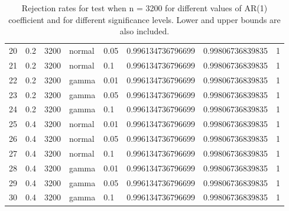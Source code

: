 \begin{table}[ht]
\begin{tabular}{rlllllll}
  20 & 0.2 & 3200 & normal & 0.05 & 0.996134736796699 & 0.99806736839835 & 1 \\ 
  21 & 0.2 & 3200 & normal & 0.1 & 0.996134736796699 & 0.99806736839835 & 1 \\ 
  22 & 0.2 & 3200 & gamma & 0.01 & 0.996134736796699 & 0.99806736839835 & 1 \\ 
  23 & 0.2 & 3200 & gamma & 0.05 & 0.996134736796699 & 0.99806736839835 & 1 \\ 
  24 & 0.2 & 3200 & gamma & 0.1 & 0.996134736796699 & 0.99806736839835 & 1 \\ 
  25 & 0.4 & 3200 & normal & 0.01 & 0.996134736796699 & 0.99806736839835 & 1 \\ 
  26 & 0.4 & 3200 & normal & 0.05 & 0.996134736796699 & 0.99806736839835 & 1 \\ 
  27 & 0.4 & 3200 & normal & 0.1 & 0.996134736796699 & 0.99806736839835 & 1 \\ 
  28 & 0.4 & 3200 & gamma & 0.01 & 0.996134736796699 & 0.99806736839835 & 1 \\ 
  29 & 0.4 & 3200 & gamma & 0.05 & 0.996134736796699 & 0.99806736839835 & 1 \\ 
  30 & 0.4 & 3200 & gamma & 0.1 & 0.996134736796699 & 0.99806736839835 & 1 \\ 
   \hline
\end{tabular}
\caption{Rejection rates for test when n = 3200 for 
                   different values of AR(1) coefficient and for different 
                   significance levels. Lower and upper bounds are also 
                   included.} 
\label{rr_3200}
\end{table}

